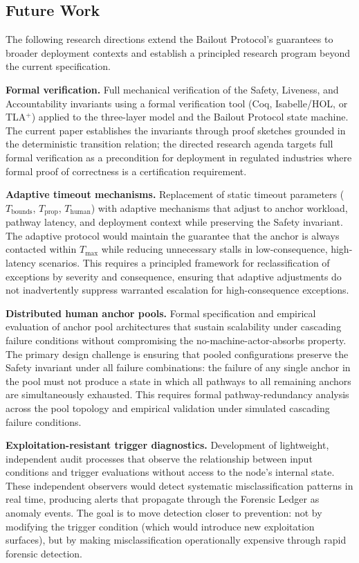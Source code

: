 \subsection{Future Work}\label{sec:future-work}

The following research directions extend the Bailout Protocol's guarantees
to broader deployment contexts and establish a principled research program
beyond the current specification.

\textbf{Formal verification.}  Full mechanical verification of the Safety,
Liveness, and Accountability invariants using a formal verification tool
(Coq, Isabelle/HOL, or TLA$^+$) applied to the three-layer model and the
Bailout Protocol state machine.  The current paper establishes the invariants
through proof sketches grounded in the deterministic transition relation;
the directed research agenda targets full formal verification as a
precondition for deployment in regulated industries where formal proof of
correctness is a certification requirement.

\textbf{Adaptive timeout mechanisms.}  Replacement of static timeout
parameters ($T_{\text{bounds}}$, $T_{\text{prop}}$, $T_{\text{human}}$) with
adaptive mechanisms that adjust to anchor workload, pathway latency, and
deployment context while preserving the Safety invariant.  The adaptive
protocol would maintain the guarantee that the anchor is always contacted
within $T_{\max}$ while reducing unnecessary stalls in low-consequence,
high-latency scenarios.  This requires a principled framework for
reclassification of exceptions by severity and consequence, ensuring that
adaptive adjustments do not inadvertently suppress warranted escalation for
high-consequence exceptions.

\textbf{Distributed human anchor pools.}  Formal specification and empirical
evaluation of anchor pool architectures that sustain scalability under
cascading failure conditions without compromising the no-machine-actor-absorbs
property.  The primary design challenge is ensuring that pooled configurations
preserve the Safety invariant under all failure combinations: the failure of
any single anchor in the pool must not produce a state in which all pathways
to all remaining anchors are simultaneously exhausted.  This requires formal
pathway-redundancy analysis across the pool topology and empirical validation
under simulated cascading failure conditions.

\textbf{Exploitation-resistant trigger diagnostics.}  Development of
lightweight, independent audit processes that observe the relationship between
input conditions and trigger evaluations without access to the node's internal
state.  These independent observers would detect systematic misclassification
patterns in real time, producing alerts that propagate through the Forensic
Ledger as anomaly events.  The goal is to move detection closer to prevention:
not by modifying the trigger condition (which would introduce new
exploitation surfaces), but by making misclassification operationally
expensive through rapid forensic detection.